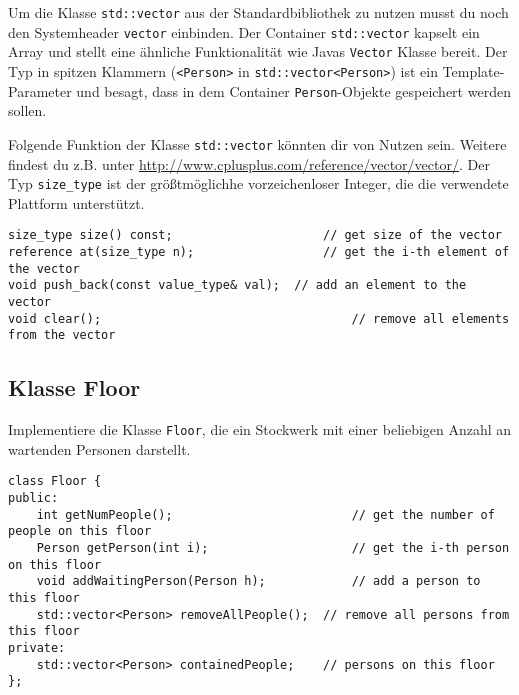 Um die Klasse \texttt{std::vector} aus der Standardbibliothek zu nutzen musst du noch den Systemheader \texttt{vector} einbinden.
Der Container \texttt{std::vector} kapselt ein Array und stellt eine ähnliche Funktionalität wie Javas \texttt{Vector} Klasse bereit.
Der Typ in spitzen Klammern (\texttt{<Person>} in \texttt{std::vector<Person>}) ist ein Template-Parameter und besagt, dass in dem Container \texttt{Person}-Objekte gespeichert werden sollen.

Folgende Funktion der Klasse \texttt{std::vector} könnten dir von Nutzen sein. Weitere findest du z.B. unter \url{http://www.cplusplus.com/reference/vector/vector/}. Der Typ \texttt{size\_type} ist der größtmöglichhe vorzeichenloser Integer, die die verwendete Plattform unterstützt.

\begin{lstlisting}
size_type size() const;						// get size of the vector
reference at(size_type n);					// get the i-th element of the vector
void push_back(const value_type& val);	// add an element to the vector
void clear();									// remove all elements from the vector
\end{lstlisting}



\subsection{Klasse Floor}
Implementiere die Klasse \texttt{Floor}, die ein Stockwerk mit einer beliebigen Anzahl an wartenden Personen darstellt.

\begin{lstlisting}
class Floor {
public:
	int getNumPeople();							// get the number of people on this floor
	Person getPerson(int i);					// get the i-th person on this floor
	void addWaitingPerson(Person h);			// add a person to this floor
	std::vector<Person> removeAllPeople();	// remove all persons from this floor
private:
	std::vector<Person> containedPeople;	// persons on this floor
};
\end{lstlisting}

